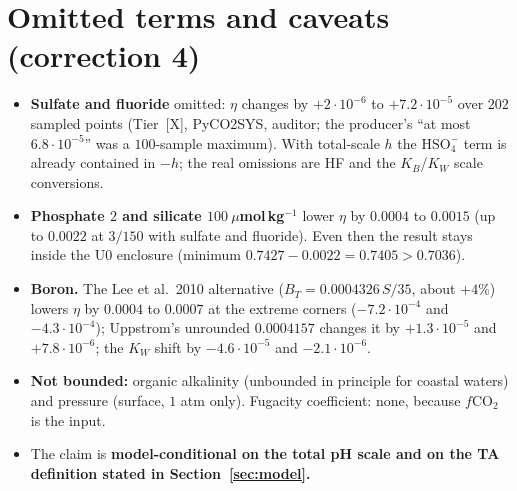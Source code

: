 \documentclass[10pt]{article}
\newcommand{\tier}[1]{\textsf{[#1]}}
\newcommand{\tX}{\tier{X}}
\begin{document}
\section{Omitted terms and caveats (correction 4)}\label{sec:caveats}
\begin{itemize}\itemsep=1pt
\item \textbf{Sulfate and fluoride} omitted: $\eta$ changes by $+2\cdot10^{-6}$ to $+7.2\cdot10^{-5}$ over $202$ sampled points (Tier~\tX{}, PyCO2SYS, auditor; the producer's ``at most $6.8\cdot10^{-5}$'' was a $100$-sample maximum). With total-scale $h$ the $\mathrm{HSO_4^-}$ term is already contained in $-h$; the real omissions are HF and the $K_B$/$K_W$ scale conversions.
\item \textbf{Phosphate $2$ and silicate $100\ \mu$mol\,kg$^{-1}$} lower $\eta$ by $0.0004$ to $0.0015$ (up to $0.0022$ at $3/150$ with sulfate and fluoride). Even then the result stays inside the U0 enclosure (minimum $0.7427-0.0022=0.7405>0.7036$).
\item \textbf{Boron.} The Lee et al.\ 2010 alternative ($B_T=0.0004326\,S/35$, about $+4\%$) lowers $\eta$ by $0.0004$ to $0.0007$ at the extreme corners ($-7.2\cdot10^{-4}$ and $-4.3\cdot10^{-4}$); Uppstrom's unrounded $0.0004157$ changes it by $+1.3\cdot10^{-5}$ and $+7.8\cdot10^{-6}$; the $K_W$ shift by $-4.6\cdot10^{-5}$ and $-2.1\cdot10^{-6}$.
\item \textbf{Not bounded:} organic alkalinity (unbounded in principle for coastal waters) and pressure (surface, $1$ atm only). Fugacity coefficient: none, because $f\mathrm{CO_2}$ is the input.
\item The claim is \textbf{model-conditional on the total pH scale and on the TA definition stated in Section~\ref{sec:model}.}
\end{itemize}

\end{document}
